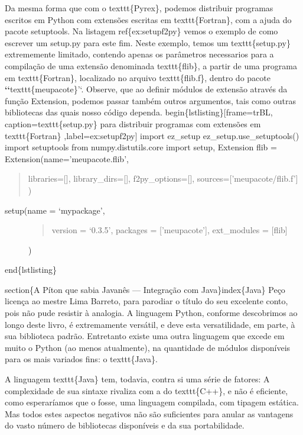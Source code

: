 \documentclass[a4paper,10pt,portuguese]{sphinxmanual}
\begin{document}
Da mesma forma que com o texttt\{Pyrex\}, podemos distribuir programas escritos em Python com extensões escritas em texttt\{Fortran\}, com a ajuda do pacote setuptools. Na listagem ref\{ex:setupf2py\} vemos o exemplo de como escrever um setup.py para este fim. Neste exemplo, temos um texttt\{setup.py\} extrememente limitado, contendo apenas os parâmetros necessarios para a compilação de uma extensão denominada texttt\{flib\}, a partir de uma programa em texttt\{Fortran\}, localizado no arquivo texttt\{flib.f\}, dentro do pacote {\color{red}\bfseries{}{}`{}`}texttt\{meupacote\}'`. Observe, que ao definir módulos de extensão através da função Extension, podemos passar também outros argumentos, tais como outras bibliotecas das quais nosso código dependa.
begin\{lstlisting\}{[}frame=trBL, caption=texttt\{setup.py\} para distribuir programas com extensões em texttt\{Fortran\} ,label=ex:setupf2py{]}
import ez\_setup
ez\_setup.use\_setuptools()
import setuptools
from numpy.distutils.core import setup, Extension
flib = Extension(name='meupacote.flib',
\begin{quote}

libraries={[}{]},
library\_dirs={[}{]},
f2py\_options={[}{]},
sources={[}'meupacote/flib.f'{]}
)
\end{quote}
\begin{description}
\item[{setup(name = `mypackage',}] \leavevmode\begin{quote}

version = `0.3.5',
packages = {[}'meupacote'{]},
ext\_modules = {[}flib{]}
\end{quote}

)

\end{description}

end\{lstlisting\}

section\{A Píton que sabia Javanês --- Integração com Java\}index\{Java\}
Peço licença ao mestre Lima Barreto, para parodiar o título do seu excelente conto, pois não pude resistir à analogia. A linguagem Python, conforme descobrimos ao longo deste livro, é extremamente versátil, e deve esta versatilidade, em parte, à sua biblioteca padrão. Entretanto existe uma outra linguagem que excede em muito o Python (ao menos atualmente), na quantidade de módulos disponíveis para os mais variados fins: o texttt\{Java\}.

A linguagem texttt\{Java\} tem, todavia, contra si uma série de fatores: A complexidade de sua sintaxe rivaliza com a do texttt\{C++\}, e não é eficiente, como esperaríamos que o fosse, uma linguagem compilada, com tipagem estática. Mas todos estes aspectos negativos não são suficientes para anular as vantagens do vasto número de bibliotecas disponíveis e da sua portabilidade.
\end{document}
